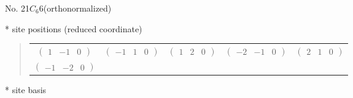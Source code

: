 \documentclass[fleqn,9pt,landscape]{jsarticle}
\begin{document}
\newpage
\begin{center}
\LARGE
No. 21\quad$C_{6}$\quad$6$\quad[ hexagonal ] (orthonormalized)
\end{center}
\vspace{5mm}
* site positions (reduced coordinate)
\begin{quote}
\begin{tabular}{ccccc}
$ \begin{pmatrix} 1 & -1 & 0 \end{pmatrix} $ & $ \begin{pmatrix} -1 & 1 & 0 \end{pmatrix} $ & $ \begin{pmatrix} 1 & 2 & 0 \end{pmatrix} $ & $ \begin{pmatrix} -2 & -1 & 0 \end{pmatrix} $ & $ \begin{pmatrix} 2 & 1 & 0 \end{pmatrix} $ \\
$ \begin{pmatrix} -1 & -2 & 0 \end{pmatrix} $ & $  $ & $  $ & $  $ & $  $
\end{tabular}
\end{quote}
* site basis
\end{document}

